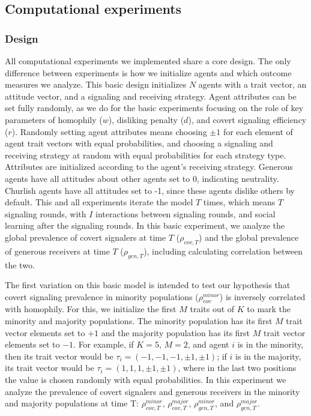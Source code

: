 \documentclass[11pt,letterpaper]{article}
\begin{document}
\subsection{Computational experiments}

\subsubsection{Design}

All computational experiments we implemented share a core design. The only 
difference between experiments is how we initialize agents and which
outcome measures we analyze. This basic design initializes $N$ agents with
a trait vector, an attitude vector, and a signaling and receiving strategy.
Agent attributes can be set fully randomly, as we do for the basic experiments focusing
on the role of key parameters of homophily ($w$), disliking penalty ($d$), and 
covert signaling efficiency ($r$). Randomly setting agent attributes means
choosing $\pm 1$ for each element of agent trait vectors with equal 
probabilities, and choosing a signaling and receiving strategy at random
with equal probabilities for each strategy type. Attributes are initialized
according to the agent's receiving strategy. Generous agents have all 
attitudes about other agents set to 0, indicating neutrality. Churlish agents
have all attitudes set to -1, since these agents dislike others by default.
This and all experiments iterate the model $T$ times, which
means $T$ signaling rounds, with $I$ interactions between signaling rounds,
and social learning after the signaling rounds. In this basic experiment,
we analyze the global prevalence of covert signalers at time $T$ ($\rho_{cov,T}$)
and the global prevalence of generous receivers at time $T$ ($\rho_{gen,T}$),
including calculating correlation between the two.

The first variation on this basic model is intended to test our 
hypothesis that covert signaling prevalence in 
minority populations ($\rho_{cov}^{minor}$) is inversely correlated with
homophily. For this, we initialize the first $M$ traits out of $K$ to mark the 
minority and majority populations. The minority population has its first
$M$ trait vector elements set to $+1$ and the majority population has its
first $M$ trait vector elements set to $-1$. For example, if $K=5$, $M=2$,
and agent $i$ is in the minority, then its trait vector would be
$\tau_i = (-1, -1, -1, \pm 1, \pm 1)$; if $i$ is in the majority, its 
trait vector would be $\tau_i = (1, 1, 1, \pm 1, \pm 1)$, where in the last
two positions the value is chosen randomly with equal probabilities.
In this experiment we analyze the prevalence of covert signalers and 
generous receivers in the minority and majority populations at time T: 
$\rho_{cov,T}^{minor}$, $\rho_{cov,T}^{major}$,
$\rho_{gen,T}^{minor}$, and $\rho_{gen,T}^{major}$.
\end{document}
